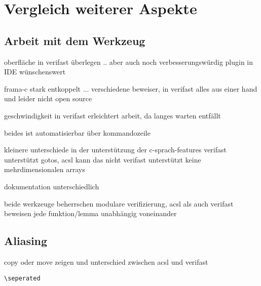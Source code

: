 ﻿\chapter{Vergleich weiterer Aspekte}

\section{Arbeit mit dem Werkzeug}

oberfläche in verifast überlegen .. aber auch noch verbesserungswürdig
plugin in IDE wünschenswert

frama-c stark entkoppelt ... verschiedene beweiser, in verifast alles aus einer hand
und leider nicht open source

geschwindigkeit in verifast erleichtert arbeit, da langes warten entfällt

beides ist automatisierbar über kommandozeile

kleinere unterschiede in der unterstützung der c-sprach-features
	verifast unterstützt gotos, acsl kann das nicht
	verifast unterstützt keine mehrdimensionalen arrays
	
	dokumentation unterschiedlich
	
	beide werkzeuge beherrschen modulare verifizierung, acsl als auch
	verifast beweisen jede funktion/lemma unabhängig voneinander

\section{Aliasing}

copy oder move zeigen und unterschied zwischen acsl und verifast

\lstinline{\seperated}

